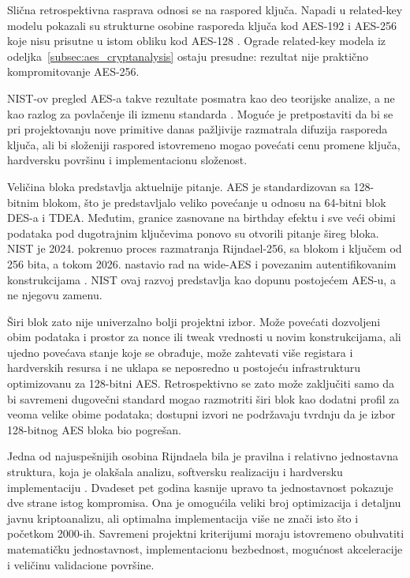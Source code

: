 Slična retrospektivna rasprava odnosi se na raspored ključa. Napadi u
related-key modelu pokazali su strukturne osobine rasporeda ključa kod
AES-192 i AES-256 koje nisu prisutne u istom obliku kod AES-128
\cite{BiryukovKhovratovich2009AES}. Ograde related-key modela iz odeljka~\ref{subsec:aes_cryptanalysis}
ostaju presudne: rezultat nije praktično kompromitovanje AES-256.

NIST-ov pregled AES-a takve rezultate posmatra kao deo teorijske analize,
a ne kao razlog za povlačenje ili izmenu standarda
\cite{MouhaDworkin2021AESReview}. Moguće je pretpostaviti da bi se pri
projektovanju nove primitive danas pažljivije razmatrala difuzija rasporeda
ključa, ali bi složeniji raspored istovremeno mogao povećati cenu promene
ključa, hardversku površinu i implementacionu složenost.

Veličina bloka predstavlja aktuelnije pitanje. AES je standardizovan sa
128-bitnim blokom, što je predstavljalo veliko povećanje u odnosu na
64-bitni blok DES-a i TDEA. Međutim, granice zasnovane na birthday efektu
i sve veći obimi podataka pod dugotrajnim ključevima ponovo su otvorili
pitanje šireg bloka. NIST je 2024. pokrenuo proces razmatranja
Rijndael-256, sa blokom i ključem od 256 bita, a tokom 2026. nastavio
rad na wide-AES i povezanim autentifikovanim konstrukcijama
\cite{NISTWideAES2024,Turan2026SymmetricStandards}. NIST ovaj razvoj
predstavlja kao dopunu postojećem AES-u, a ne njegovu zamenu.

Širi blok zato nije univerzalno bolji projektni izbor. Može povećati
dozvoljeni obim podataka i prostor za nonce ili tweak vrednosti u novim
konstrukcijama, ali ujedno povećava stanje koje se obrađuje, može zahtevati
više registara i hardverskih resursa i ne uklapa se neposredno u postojeću
infrastrukturu optimizovanu za 128-bitni AES. Retrospektivno se zato može
zaključiti samo da bi savremeni dugovečni standard mogao razmotriti širi
blok kao dodatni profil za veoma velike obime podataka; dostupni izvori ne
podržavaju tvrdnju da je izbor 128-bitnog AES bloka bio pogrešan.

Jedna od najuspešnijih osobina Rijndaela bila je pravilna i relativno
jednostavna struktura, koja je olakšala analizu, softversku realizaciju i
hardversku implementaciju \cite{NechvatalEtAl2001AESDevelopment,
DaemenRijmen2002}. Dvadeset pet godina kasnije upravo ta jednostavnost
pokazuje dve strane istog kompromisa. Ona je omogućila veliki broj
optimizacija i detaljnu javnu kriptoanalizu, ali optimalna implementacija
više ne znači isto što i početkom 2000-ih. Savremeni projektni kriterijumi
moraju istovremeno obuhvatiti matematičku jednostavnost, implementacionu
bezbednost, mogućnost akceleracije i veličinu validacione površine.


